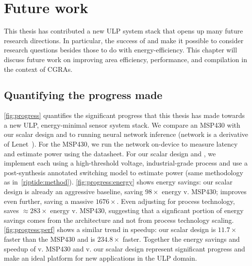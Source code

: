 \chapter{Future work}
\label{chapter:future}
This thesis has contributed a new ULP system stack that opens up many future research directions.
% 
In particular, the success of \snafu and \riptide make it possible to consider research questions besides those to do with energy-efficiency.
% 
This chapter will discuss future work on improving area efficiency, performance, and compilation in the context of CGRAs.

\figProgress
\section{Quantifying the progress made}
\autoref{fig:progress} quantifies the significant progress that this thesis has made towards a new ULP, energy-minimal sensor system stack.
%
We compare an MSP430 with our scalar design and to \riptide running neural network inference (network is a derivative of Lenet~\cite{lecun:ieee89:lenet}).
% 
For the MSP430, we run the network on-device to measure latency and estimate power using the datasheet. 
% 
For our scalar design and \riptide, we implement each using a high-threshold voltage, industrial-grade process and use a post-synthesis annotated switching model to estimate power (same methodology as in~\autoref{riptide:method}).
% 
\autoref{fig:progress:energy} shows energy savings: our scalar design is already an aggressive baseline, saving $98\times$ energy v. MSP430; \riptide improves even further, saving a massive $1676\times$.
% 
Even adjusting for process technology, \riptide saves $\approx 283 \times$ energy v. MSP430, suggesting that a signficant portion of energy savings comes from the architecture and not from process technology scaling.
% 
\autoref{fig:progress:perf} shows a similar trend in speedup: our scalar design is $11.7\times$ faster than the MSP430 and \riptide is $234.8\times$ faster.
% 
Together the energy savings and speedup of \riptide v. MSP430 and v. our scalar design represent significant progress and make \riptide an ideal platform for new applications in the ULP domain.

\figFutureModel
